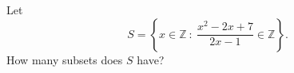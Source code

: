 Let
\[S=\left\{x\in\mathbb Z\ :\ \dfrac{x^2-2x+7}{2x-1}\in\mathbb Z\right\}.\]
How many subsets does $S$ have?

